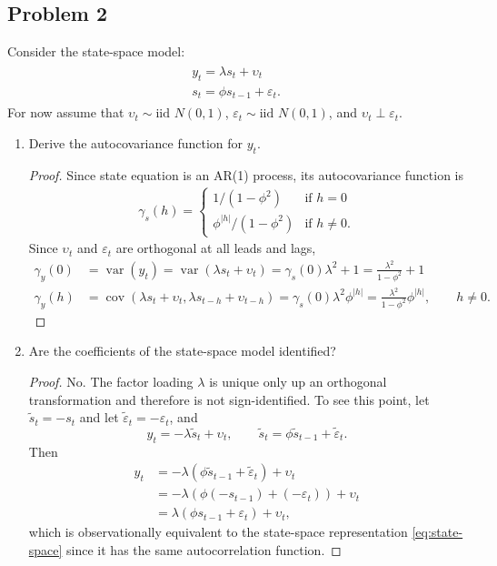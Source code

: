 \documentclass[oneside,reqno]{amsart}
\DeclareMathOperator{\var}{var}
\DeclareMathOperator{\cov}{cov}
\newcommand{\eps}{\varepsilon}
\newcommand{\ups}{\upsilon}
\theoremstyle{definition}
\begin{document}
\subsection*{Problem 2}
Consider the state-space model:
\begin{align}\label{eq:state-space}
\begin{split}
	y_t = \lambda s_t + \ups_t   \\
	s_t = \phi s_{t-1} + \eps_t.
\end{split}
\end{align}
For now assume that $\ups_t \sim \text{iid }N(0,1)$, $\eps_t \sim \text{iid }N(0,1)$, and $\ups_t \perp\eps_t$.
\begin{enumerate}
\item
Derive the autocovariance function for $y_t$.

\begin{proof}
Since state equation is an AR(1) process, its autocovariance function is
\begin{align*}
	\gamma_s(h)  = \begin{cases}
		1/(1-\phi^2) & \text{if } h = 0 \\
		\phi^{|h|}/(1-\phi^2) & \text{if } h \neq 0.				
	\end{cases}
\end{align*}
Since $\ups_t$ and $\eps_t$ are orthogonal at all leads and lags, 
\begin{align*}
	\gamma_y(0) &= \var(y_t) = \var(\lambda s_t + \ups_t) 
		= \gamma_s(0)\lambda^2 + 1 
		= \frac{\lambda^2}{1-\phi^2} + 1 \\
	\gamma_y(h) &= \cov(\lambda s_t + \ups_t, \lambda s_{t-h} + \ups_{t-h}) 
		= \gamma_s(0) \lambda^2 \phi^{|h|} = \frac{\lambda^2}{1-\phi^2} \phi^{|h|}, \qquad h \neq 0.
\end{align*}
\end{proof}

\item
Are the coefficients of the state-space model identified?

\begin{proof}
No. The factor loading $\lambda$ is unique only up an orthogonal transformation and therefore is not sign-identified. To see this point, let $\tilde s_t = -s_t$ and let $\tilde\eps_t = -\eps_t$, and 
\[
	y_t = -\lambda \tilde s_t + \ups_t, \qquad \tilde s_t = \phi \tilde s_{t-1} + \tilde\eps_t.
\]
Then 
\begin{align*}
	y_t &= -\lambda (\phi \tilde s_{t-1} + \tilde\eps_t) + \ups_t \\
	&= -\lambda (\phi (- s_{t-1}) + (-\eps_t)) + \ups_t \\
	&= \lambda (\phi s_{t-1}  + \eps_t) + \ups_t,
\end{align*}
which is observationally equivalent to the state-space representation \eqref{eq:state-space} since it has the same autocorrelation function.
\end{proof}


\end{enumerate}
\end{document}
